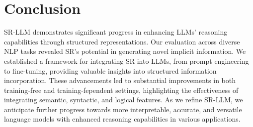 \section{Conclusion}


SR-LLM demonstrates significant progress in enhancing LLMs' reasoning capabilities through structured representations. Our evaluation across diverse NLP tasks revealed SR's potential in generating novel implicit information. We established a framework for integrating SR into LLMs, from prompt engineering to fine-tuning, providing valuable insights into structured information incorporation. These advancements led to substantial improvements in both training-free and training-fependent settings, highlighting the effectiveness of integrating semantic, syntactic, and logical features. As we refine SR-LLM, we anticipate further progress towards more interpretable, accurate, and versatile language models with enhanced reasoning capabilities in various applications.